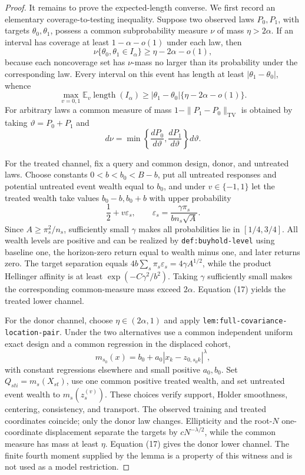 \documentclass{article}
\begin{document}
\begin{proof}
It remains to prove the expected-length converse.  We first record an elementary coverage-to-testing inequality.  Suppose two observed laws \(P_0,P_1\), with targets \(\theta_0,\theta_1\), possess a common subprobability measure \(\nu\) of mass \(\eta>2\alpha\).  If an interval has coverage at least \(1-\alpha-o(1)\) under each law, then
\[
 \nu\{\theta_0,\theta_1\in I_\alpha\}
 \ge\eta-2\alpha-o(1),                                    \tag{16}
\]
because each noncoverage set has \(\nu\)-mass no larger than its probability under the corresponding law.  Every interval on this event has length at least \(|\theta_1-\theta_0|\), whence
\[
 \max_{v=0,1}\mathbb E_v\operatorname{length}(I_\alpha)
 \ge |\theta_1-\theta_0|\{\eta-2\alpha-o(1)\}.           \tag{17}
\]
For arbitrary laws a common measure of mass
\(1-\|P_1-P_0\|_{\mathrm{TV}}\) is obtained by taking
\(\vartheta=P_0+P_1\) and
\[
 d\nu=\min\left\{\frac{dP_0}{d\vartheta},
                    \frac{dP_1}{d\vartheta}\right\}
 d\vartheta.                                                \tag{18}
\]

For the treated channel, fix a query and common design, donor, and untreated laws.  Choose constants \(0<b<b_0<B-b\), put all untreated responses and potential untreated event wealth equal to \(b_0\), and under \(v\in\{-1,1\}\) let the treated wealth take values \(b_0-b,b_0+b\) with upper probability
\[
 \frac12+v\varepsilon_s,
 \qquad
 \varepsilon_s=\frac{\gamma\pi_s}{bn_s\sqrt A}.            \tag{19}
\]
Since \(A\ge\pi_s^2/n_s\), sufficiently small \(\gamma\) makes all probabilities lie in \([1/4,3/4]\).  All wealth levels are positive and can be realized by \texttt{def:buyhold-level} using baseline one, the horizon-zero return equal to wealth minus one, and later returns zero.  The target separation equals
\(4b\sum_s\pi_s\varepsilon_s=4\gamma A^{1/2}\), while the product Hellinger affinity is at least
\(\exp(-C\gamma^2/b^2)\).  Taking \(\gamma\) sufficiently small makes the corresponding common-measure mass exceed \(2\alpha\).  Equation (17) yields the treated lower channel.

For the donor channel, choose \(\eta\in(2\alpha,1)\) and apply \texttt{lem:full-covariance-location-pair}.  Under the two alternatives use a common independent uniform exact design and a common regression in the displaced cohort,
\[
 m_{s_0}(x)=b_0+a_0|x_k-z_{0,s_0k}|^\lambda,               \tag{20}
\]
with constant regressions elsewhere and small positive \(a_0,b_0\).  Set \(Q_{sti}=m_s(X_{st})\), use one common positive treated wealth, and set untreated event wealth to \(m_s(z_s^{(v)})\).  These choices verify support, Holder smoothness, centering, consistency, and transport.  The observed training and treated coordinates coincide; only the donor law changes.  Ellipticity and the root-\(N\) one-coordinate displacement separate the targets by \(cN^{-\lambda/2}\), while the common measure has mass at least \(\eta\).  Equation (17) gives the donor lower channel.  The finite fourth moment supplied by the lemma is a property of this witness and is not used as a model restriction.


\end{proof}
\end{document}
